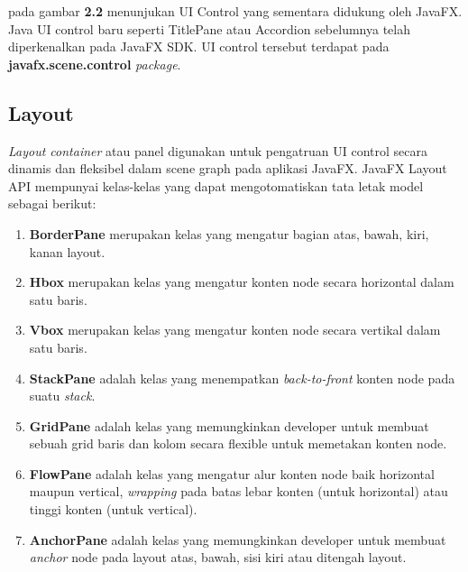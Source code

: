 	pada gambar \textbf{2.2} menunjukan UI Control yang sementara didukung oleh JavaFX. Java UI control baru seperti TitlePane atau Accordion sebelumnya telah diperkenalkan pada JavaFX SDK. UI control tersebut terdapat pada \textbf{javafx.scene.control} \textit{package}.\cite{javafx}
 
\subsection{Layout}
\label{subs:Layout}
 \textit{Layout container} atau panel digunakan untuk pengatruan UI control secara dinamis dan fleksibel dalam scene graph pada aplikasi JavaFX. JavaFX Layout API mempunyai kelas-kelas yang dapat mengotomatiskan tata letak model sebagai berikut:\cite{javafx}
\begin{enumerate}
	\item \textbf{BorderPane} merupakan kelas yang mengatur bagian atas, bawah, kiri, kanan layout.
	\item \textbf{Hbox} merupakan kelas yang mengatur konten node secara horizontal dalam satu baris.
	\item  \textbf{Vbox} merupakan kelas yang mengatur konten node secara vertikal dalam satu baris.
	\item \textbf{StackPane} adalah kelas yang menempatkan \textit{back-to-front} konten node pada suatu \textit{stack}.
	\item \textbf{GridPane} adalah kelas yang memungkinkan developer untuk membuat sebuah grid baris dan kolom secara flexible untuk memetakan konten node.
	\item \textbf{FlowPane} adalah kelas yang mengatur alur konten node baik horizontal maupun vertical, \textit{wrapping} pada batas lebar konten (untuk horizontal) atau tinggi konten (untuk vertical).
	\item \textbf{AnchorPane} adalah kelas yang memungkinkan developer untuk membuat \textit{anchor} node pada layout atas, bawah, sisi kiri atau ditengah layout. 
\end{enumerate}

